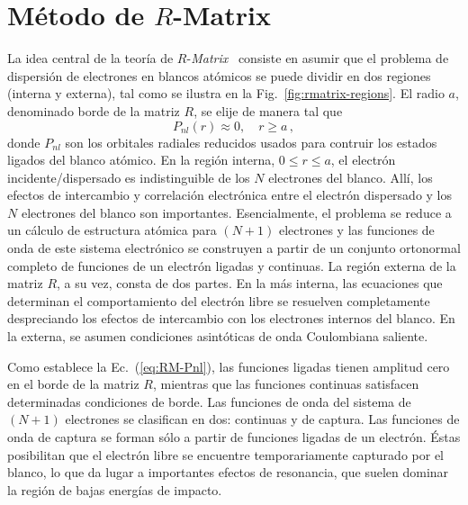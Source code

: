 \section{Método de $R$-Matrix}
\label{sec:proc-rmatrix}

La idea central de la teoría de $R$-\textit{Matrix}~\cite{Burke:11,
Burke:75,Griffin:07} consiste en asumir que el problema de dispersión de 
electrones en blancos atómicos se puede dividir en dos regiones (interna 
y externa), tal como se ilustra en la Fig.~\ref{fig:rmatrix-regions}. El 
radio $a$, denominado borde de la matriz $R$, se elije de manera tal que 
\begin{equation}
P_{nl}(r)\approx 0, \quad r\geq a\,,
\label{eq:RM-Pnl}
\end{equation}
donde $P_{nl}$ son los orbitales radiales reducidos usados para
contruir los estados ligados del blanco atómico.
%
En la región interna, $0\leq r\leq a$, el electrón incidente/dispersado 
es indistinguible de los $N$ electrones del blanco. Allí, los efectos de 
intercambio y correlación electrónica entre el electrón 
dispersado y los $N$ electrones del blanco son importantes. 
Esencialmente, el problema se reduce a un cálculo de estructura atómica 
para $(N+1)$ electrones y las funciones de onda de este sistema 
electrónico se construyen a partir de un conjunto ortonormal completo de 
funciones de un electrón ligadas y continuas. 
%
La región externa de la matriz $R$, a su vez, consta de dos partes. En 
la más interna, las ecuaciones que determinan el comportamiento del 
electrón libre se resuelven completamente despreciando los efectos 
de intercambio con los electrones internos del blanco. En la externa, se 
asumen condiciones asintóticas de onda Coulombiana saliente. 

Como establece la Ec.~(\ref{eq:RM-Pnl}), las funciones ligadas tienen 
amplitud cero en el borde de la matriz $R$, mientras que las funciones 
continuas satisfacen determinadas condiciones de borde. Las funciones de 
onda del sistema de $(N+1)$ electrones se clasifican en dos: continuas y 
de captura. Las funciones de onda de captura se forman sólo a partir de 
funciones ligadas de un electrón. Éstas posibilitan que el electrón 
libre se encuentre temporariamente capturado por el blanco, lo 
que da lugar a importantes efectos de resonancia, que suelen dominar la 
región de bajas energías de impacto. 

